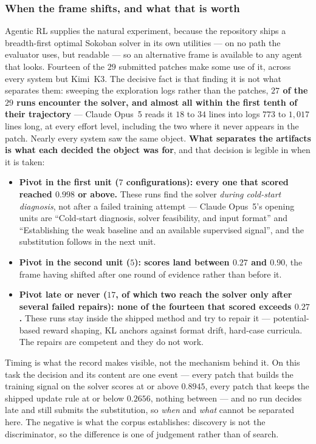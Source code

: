\subsubsection{When the frame shifts, and what that is worth}
\label{sec:convergent}

Agentic RL supplies the natural experiment, because the repository ships a breadth-first optimal
Sokoban solver in its own utilities --- on no path the evaluator uses, but readable --- so an
alternative frame is available to any agent that looks. Fourteen of the $29$ submitted patches make some use of it,
across every system but Kimi~K3. The decisive fact is that finding it is not what separates them:
sweeping the exploration logs rather than the patches, \textbf{$27$ of the $29$ runs encounter the
solver, and almost all within the first tenth of their trajectory} --- Claude Opus~5 reads it $18$ to
$34$ lines into logs $773$ to $1{,}017$ lines long, at every effort level, including the two where it
never appears in the patch. Nearly every system saw the same object. \textbf{What separates the
artifacts is what each decided the object was for}, and that decision is legible in when it is taken:

\begin{itemize}[leftmargin=*,itemsep=2pt,topsep=3pt]
\item \textbf{Pivot in the first unit ($7$ configurations): every one that scored reached $0.998$ or
above.} These runs find the solver \emph{during cold-start diagnosis}, not after a failed training
attempt --- Claude Opus~5's opening units are ``Cold-start diagnosis, solver feasibility, and input
format'' and ``Establishing the weak baseline and an available supervised signal'', and the
substitution follows in the next unit.
\item \textbf{Pivot in the second unit ($5$): scores land between $0.27$ and $0.90$}, the frame having
shifted after one round of evidence rather than before it.
\item \textbf{Pivot late or never ($17$, of which two reach the solver only after several failed
repairs): none of the fourteen that scored exceeds $0.27$.} These runs stay inside the shipped
method and try to repair it --- potential-based reward shaping, KL anchors against format drift,
hard-case curricula. The repairs are competent and they do not work.
\end{itemize}

Timing is what the record makes visible, not the mechanism behind it. On this
task the decision and its content are one event --- every patch that builds the training signal on the
solver scores at or above $0.8945$, every patch that keeps the shipped update rule at or below
$0.2656$, nothing between --- and no run decides late and still submits the substitution, so
\emph{when} and \emph{what} cannot be separated here. The negative is what the corpus establishes:
discovery is not the discriminator, so the difference is one of judgement rather than of search.

